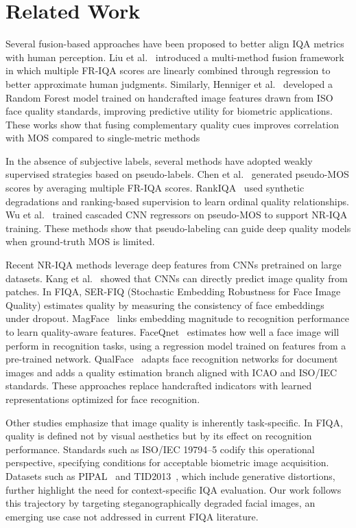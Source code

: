 \section{Related Work}

Several fusion-based approaches have been proposed to better align IQA metrics with human perception. Liu et al.~\cite{liu2013mmf} introduced a multi-method fusion framework in which multiple FR-IQA scores are linearly combined through regression to better approximate human judgments. Similarly, Henniger et al.~\cite{henniger2020biosig} developed a Random Forest model trained on handcrafted image features drawn from ISO face quality standards, improving predictive utility for biometric applications. These works show that fusing complementary quality cues improves correlation with MOS compared to single-metric methods

In the absence of subjective labels, several methods have adopted weakly supervised strategies based on pseudo-labels. Chen et al.~\cite{chen2021pseudo} generated pseudo-MOS scores by averaging multiple FR-IQA scores. RankIQA~\cite{liu2017rankiqa} used synthetic degradations and ranking-based supervision to learn ordinal quality relationships. Wu et al.~\cite{wu2020cnn} trained cascaded CNN regressors on pseudo-MOS to support NR-IQA training. These methods show that pseudo-labeling can guide deep quality models when ground-truth MOS is limited.

Recent NR-IQA methods leverage deep features from CNNs pretrained on large datasets. Kang et al.~\cite{kang2014cnn} showed that CNNs can directly predict image quality from patches. In FIQA, SER-FIQ\cite{terhorst2020serfiq} (Stochastic Embedding Robustness for Face Image Quality) estimates quality by measuring the consistency of face embeddings under dropout. MagFace~\cite{meng2021magface} links embedding magnitude to recognition performance to learn quality-aware features. FaceQnet~\cite{hernandez2019faceqnet} estimates how well a face image will perform in recognition tasks, using a regression model trained on features from a pre-trained network. QualFace~\cite{tremoco2021qualface} adapts face recognition networks for document images and adds a quality estimation branch aligned with ICAO and ISO/IEC standards. These approaches replace handcrafted indicators with learned representations optimized for face recognition.

Other studies emphasize that image quality is inherently task-specific. In FIQA, quality is defined not by visual aesthetics but by its effect on recognition performance. Standards such as ISO/IEC 19794--5 codify this operational perspective, specifying conditions for acceptable biometric image acquisition. Datasets such as PIPAL~\cite{pipal} and TID2013~\cite{tid2013}, which include generative distortions, further highlight the need for context-specific IQA evaluation. Our work follows this trajectory by targeting steganographically degraded facial images, an emerging use case not addressed in current FIQA literature.
